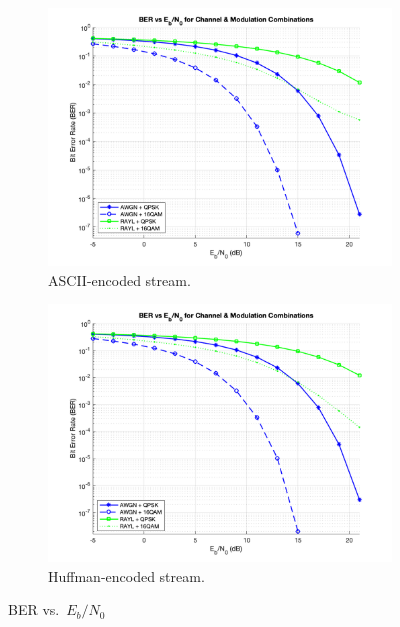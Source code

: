 \begin{figure}[H]

    \centering
    \begin{subfigure}{0.45\textwidth}
        \includegraphics*[scale = 0.18]{Images/ascii_encode.png}
        \caption{ASCII-encoded stream.}
        \label{fig:ascii_BER}
    \end{subfigure}
    \begin{subfigure}{0.45\textwidth}
        \includegraphics*[scale = 0.19]{Images/huffman_encode.png}
        \caption{Huffman-encoded stream.}
        \label{fig:huffman_BER}
    \end{subfigure}
    
    \caption{BER vs.\ $E_b/N_0$ }
    \label{fig:BER_SNR}
\end{figure}

